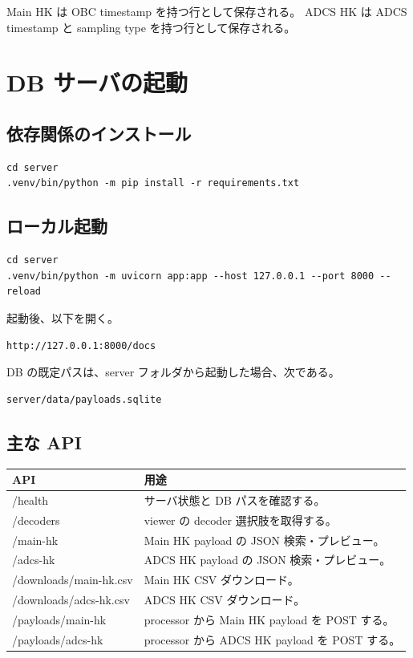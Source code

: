 \documentclass[a4paper,11pt]{ltjsarticle}
\begin{document}
Main HK は OBC timestamp を持つ行として保存される。
ADCS HK は ADCS timestamp と sampling type を持つ行として保存される。

\section{DB サーバの起動}

\subsection{依存関係のインストール}

\begin{verbatim}
cd server
.venv/bin/python -m pip install -r requirements.txt
\end{verbatim}

\subsection{ローカル起動}

\begin{verbatim}
cd server
.venv/bin/python -m uvicorn app:app --host 127.0.0.1 --port 8000 --reload
\end{verbatim}

起動後、以下を開く。

\begin{verbatim}
http://127.0.0.1:8000/docs
\end{verbatim}

DB の既定パスは、server フォルダから起動した場合、次である。

\begin{verbatim}
server/data/payloads.sqlite
\end{verbatim}

\subsection{主な API}

\begin{center}
\begin{tabular}{>{\ttfamily}p{54mm}p{94mm}}
\toprule
API & 用途 \\
\midrule
/health & サーバ状態と DB パスを確認する。 \\
/decoders & viewer の decoder 選択肢を取得する。 \\
/main-hk & Main HK payload の JSON 検索・プレビュー。 \\
/adcs-hk & ADCS HK payload の JSON 検索・プレビュー。 \\
/downloads/main-hk.csv & Main HK CSV ダウンロード。 \\
/downloads/adcs-hk.csv & ADCS HK CSV ダウンロード。 \\
/payloads/main-hk & processor から Main HK payload を POST する。 \\
/payloads/adcs-hk & processor から ADCS HK payload を POST する。 \\
\bottomrule
\end{tabular}
\end{center}
\end{document}
